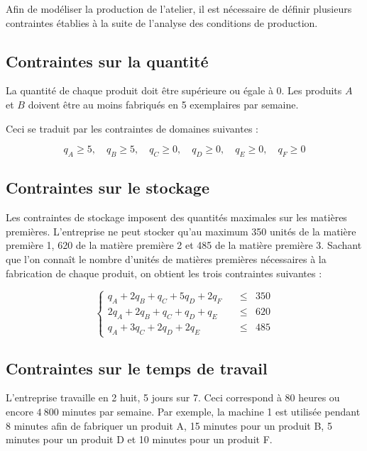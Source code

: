 \documentclass[paper=a4, fontsize=11pt]{report}
\numberwithin{equation}{section}		%
\numberwithin{figure}{section}			%
\numberwithin{table}{section}				%
\begin{document}
Afin de modéliser la production de l'atelier, il est nécessaire de définir plusieurs contraintes établies à la suite de l'analyse des conditions de production.

\subsection{Contraintes sur la quantité}

La quantité de chaque produit doit être supérieure ou égale à 0. Les produits $A$ et $B$ doivent être au moins fabriqués en 5 exemplaires par semaine.

Ceci se traduit par les contraintes de domaines suivantes : 

\begin{equation}
q_A \geq 5, \quad q_B \geq 5, \quad q_C \geq 0, \quad q_D \geq 0, \quad q_E \geq 0, \quad q_F \geq 0 
\label{ctr_quantite}
\end{equation} 

\subsection{Contraintes sur le stockage}
Les contraintes de stockage imposent des quantités maximales sur les matières premières. L'entreprise ne peut stocker qu'au maximum 350 unités de la matière première 1, 620 de la matière première 2 et 485 de la matière première 3. Sachant que l'on connaît le nombre d'unités de matières premières nécessaires à la fabrication de chaque produit, on obtient les trois contraintes suivantes :  

\begin{equation}
  \left\{
    \begin{aligned}
q_A + 2 q_B + q_C + 5q_D + 2q_F \quad & \leq & 350 \\
2q_A + 2q_B + q_C + q_D + q_E \quad & \leq & 620 \\
q_A + 3 q_C + 2q_D + 2q_E \quad & \leq & 485 
    \end{aligned}
  \right.
\label{ctr_stockage}
\end{equation}

\subsection{Contraintes sur le temps de travail}

L'entreprise travaille en 2 huit, 5 jours sur 7. Ceci correspond à 80 heures ou encore $4\:800$ minutes par semaine. Par exemple, la machine 1 est utilisée pendant 8 minutes afin de fabriquer un produit A, 15 minutes pour un produit B, 5 minutes pour un produit D et 10 minutes pour un produit F.
\end{document}
